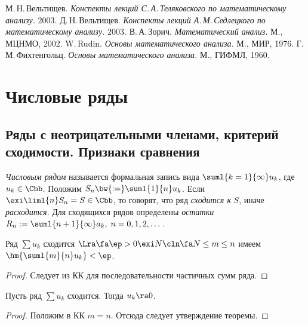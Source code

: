 \documentclass[a4paper]{article}
\begin{document}
\begin{thebibliography}{5}
    \setlength\itemsep{-3pt}
     М.\,Н.\,Вельтищев. \emph{Конспекты лекций С.\,А.\,Теляковского
                                   по математическому анализу.} 2003.
       Д.\,Н.\,Вельтищев. \emph{Конспекты лекций А.\,М.\,Седлецкого
                                   по математическому анализу.} 2003.
                   В.\,А.\,Зорич. \emph{Математический анализ.} М., МЦНМО, 2002.
                    W.\,Rudin. \emph{Основы математического анализа.} М., МИР, 1976.
                     Г.\,М.\,Фихтенгольц. \emph{Основы математического анализа.} М., ГИФМЛ, 1960.
\end{thebibliography}

\pagebreak

\section{Числовые ряды}

\subsection{Ряды с неотрицательными членами, критерий сходимости. Признаки сравнения}

\begin{df}
\emph{Числовым рядом} называется формальная запись вида $\suml{k=1}{\infty} u_k$, где $u_k \in \Cbb$. Положим
$S_n\bw{:=}\suml{1}{n} u_k$. Если $\exi \liml{n} S_n = S \in \Cbb$, то говорят, что ряд \emph{сходится к} $S$,
иначе \emph{расходится}. Для сходящихся рядов
определены \emph{остатки} $R_n := \suml{n+1}{\infty} a_k,\; n=0,1,2,\dots$.
\end{df}

\begin{theorem}[КК]
Ряд $\sum u_k$ сходится $\Lra \fa \ep > 0 \exi N\cln \fa N \le m \le n$ имеем
$\hm{\suml{m}{n} u_k} < \ep$.
\end{theorem}
\begin{proof}
Следует из КК для последовательности частичных сумм ряда.
\end{proof}

\begin{theorem}
Пусть ряд $\sum u_k$ сходится. Тогда $u_k \ra 0$.
\end{theorem}
\begin{proof}
Положим в КК $m=n$. Отсюда следует утверждение теоремы.
\end{proof}
\end{document}

